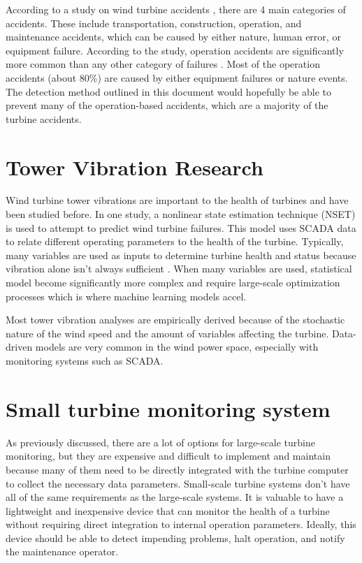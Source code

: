 According to a study on wind turbine accidents \cite{wind_turbine_accidents}, there are 4 main categories of accidents.  These include transportation, construction, operation, and maintenance accidents, which can be caused by either nature, human error, or equipment failure.  According to the study, operation accidents are significantly more common than any other category of failures \cite{wind_turbine_failures}.  Most of the operation accidents (about 80\%) are caused by either equipment failures or nature events.  The detection method outlined in this document would hopefully be able to prevent many of the operation-based accidents, which are a majority of the turbine accidents.

\section{Tower Vibration Research}
Wind turbine tower vibrations are important to the health of turbines and have been studied before.  In one study, a nonlinear state estimation technique \cite{NSET_vibration_modeling} (NSET) is used to attempt to predict wind turbine failures.  This model uses SCADA data to relate different operating parameters to the health of the turbine.  Typically, many variables are used as inputs to determine turbine health and status because vibration alone isn't always sufficient \cite{NSET_vibration_modeling}.  When many variables are used, statistical model become significantly more complex and require large-scale optimization processes which is where machine learning models accel.

Most tower vibration analyses are empirically derived because of the stochastic nature of the wind speed and the amount of variables affecting the turbine.  Data-driven models \cite{data_driven_online_monitoring} are very common in the wind power space, especially with monitoring systems such as SCADA.

\section{Small turbine monitoring system}
As previously discussed, there are a lot of options for large-scale turbine monitoring, but they are expensive and difficult to implement and maintain because many of them need to be directly integrated with the turbine computer to collect the necessary data parameters.  Small-scale turbine systems don't have all of the same requirements as the large-scale systems.  It is valuable to have a lightweight and inexpensive device that can monitor the health of a turbine without requiring direct integration to internal operation parameters.  Ideally, this device should be able to detect impending problems, halt operation, and notify the maintenance operator.

